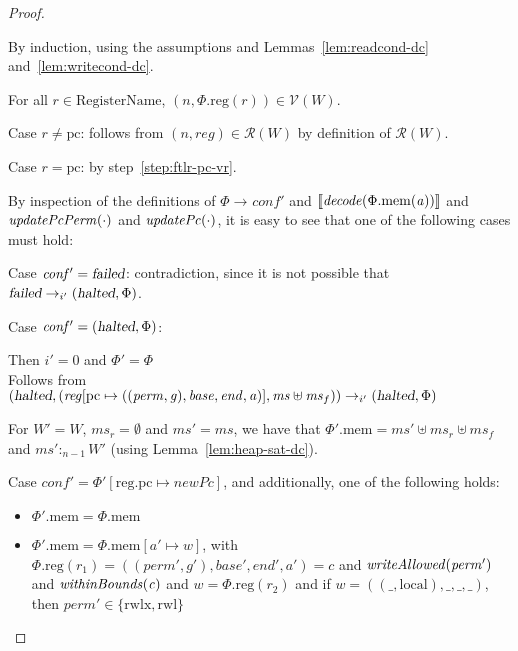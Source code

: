 \documentclass[a4paper]{article}
\newcommand{\update}[2]{[#1 \mapsto #2]}
\newcommand{\sem}[1]{\left\llbracket #1 \right\rrbracket}
\newcommand{\var}[1]{\mathit{#1}}
\newcommand{\hs}{\var{ms}}
\newcommand{\ms}{\hs}
\newcommand{\gl}{\var{g}}
\newcommand{\pcreg}{\mathrm{pc}}
\newcommand{\addr}{\var{a}}
\newcommand{\start}{\var{base}}
\newcommand{\addrend}{\var{end}}
\newcommand{\reg}{\var{reg}}
\newcommand{\heap}{\var{mem}}
\newcommand{\perm}{\var{perm}}
\newcommand{\plainproj}[1]{\mathrm{#1}}
\newcommand{\memheap}[1][\Phi]{#1.\plainproj{mem}}
\newcommand{\memreg}[1][\Phi]{#1.\plainproj{reg}}
\newcommand{\updateReg}[3][\Phi]{#1\update{\plainproj{reg}.#2}{#3}}
\newcommand{\failed}{\textsl{failed}}
\newcommand{\halted}{\textsl{halted}}
\newcommand{\plainfun}[2]{
  \ifthenelse{\equal{#2}{}}
  {\mathit{#1}}
  {\mathit{#1}(#2)}
}
\newcommand{\decode}{\plainfun{decode}{}}
\newcommand{\updatePcPerm}[1]{\plainfun{updatePcPerm}{#1}}
\newcommand{\writeAllowed}[1]{\plainfun{writeAllowed}{#1}}
\newcommand{\withinBounds}[1]{\plainfun{withinBounds}{#1}}
\newcommand{\stdUpdatePc}[1]{\plainfun{updatePc}{#1}}
\newcommand{\heapSat}[3][\heap]{#1 :_{#2} #3}
\newcommand{\asmType}{\plaindom{AsmType}}
\newcommand{\plaindom}[1]{\mathrm{#1}}
\newcommand{\RegName}{\plaindom{RegisterName}}
\newcommand{\intr}[2]{\mathcal{#1}}
\newcommand{\valueintr}[1]{\intr{V}{#1}}
\newcommand{\regintr}[1]{\intr{R}{#1}}
\newcommand{\stdvr}{\valueintr{\asmType}}
\newcommand{\stdrr}{\regintr{\asmType}}
\newcommand{\npair}[2][n]{\left(#1,#2 \right)}
\newcommand{\plainperm}[1]{\mathrm{#1}}
\newcommand{\readwritel}{\plainperm{rwl}}
\newcommand{\rwlx}{\plainperm{rwlx}}
\newcommand{\local}{\plainperm{local}}
\newcommand{\step}[1][]{\rightarrow_{#1}}
\begin{document}
\begin{proof}
\begin{enumproof}
\begin{enumproof}
    \item By induction, using the assumptions and Lemmas~\ref{lem:readcond-dc}
      and~\ref{lem:writecond-dc}.
    \end{enumproof}
  \item For all $r \in \RegName$, $\npair[n]{\memreg(r)}\in\stdvr(W)$. \label{step:ftlr-reg-rr}
    \begin{enumproof}
    \item Case $r \neq \pcreg$: follows from $\npair[n]{\reg}\in \stdrr(W)$ by
      definition of $\stdrr(W)$.
    \item Case $r = \pcreg$: by step~\ref{step:ftlr-pc-vr}.
    \end{enumproof}
  \item By inspection of the definitions of $\Phi\step \var{conf'}$ and
    $\sem{\decode(\memheap(\addr))}$ and $\updatePcPerm{\cdot}$ and
    $\stdUpdatePc{\cdot}$, it is easy to see that one of the following cases
    must hold:
  \item Case $\var{conf'} = \failed$: contradiction, since it is not possible
    that $\failed \step[i'] (\halted,\Phi)$. 
  \item Case $\var{conf'} = (\halted,\Phi)$:
    \begin{enumproof}
    \item Then $i' = 0$ and $\Phi' =
      \Phi$\\
      Follows from $(\halted,
      (\reg\update{\pcreg}{((\perm,\gl),\start,\addrend,\addr)},\hs \uplus
      \ms_f)) \step[i'] (\halted,\Phi)$
    \item For $W' = W$, $\ms_r = \emptyset$ and $\ms' = \ms$, we have that
      $\memheap[\Phi'] = \hs' \uplus \hs_r \uplus \ms_f$ and
      $\heapSat[\hs']{n-1}{W'}$ (using Lemma~\ref{lem:heap-sat-dc}).
    \end{enumproof}
  \item Case $\var{conf'} = \updateReg[\Phi']{\pcreg}{\var{newPc}}$, and additionally, one of the following
    holds:
    \begin{itemize}
    \item $\memheap[\Phi'] = \memheap[\Phi]$
    \item $\memheap[\Phi'] = \memheap[\Phi]\update{\addr'}{\var{w}}$, with
      $\memreg[\Phi](r_1) = ((\perm',\gl'),\start',\addrend',\addr') = c$ and
      $\writeAllowed{\perm'}$ and $\withinBounds{\var{c}}$ and $\var{w} =
      \memreg(r_2)$ and if $\var{w} = ((\_,\local),\_,\_,\_)$, then $\perm' \in
      \{\rwlx,\readwritel \}$
    \end{itemize}

\end{enumproof}
\end{proof}
\end{document}
